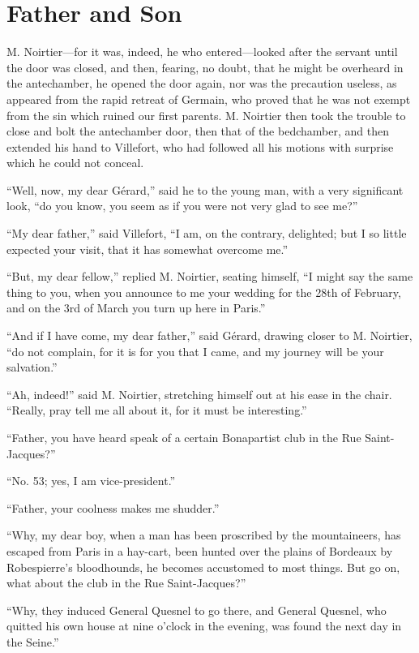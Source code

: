 \chapter{Father and Son}

M. Noirtier—for it was, indeed, he who entered—looked after the servant
until the door was closed, and then, fearing, no doubt, that he might
be overheard in the antechamber, he opened the door again, nor was the
precaution useless, as appeared from the rapid retreat of Germain, who
proved that he was not exempt from the sin which ruined our first
parents. M. Noirtier then took the trouble to close and bolt the
antechamber door, then that of the bedchamber, and then extended his
hand to Villefort, who had followed all his motions with surprise which
he could not conceal.

“Well, now, my dear Gérard,” said he to the young man, with a very
significant look, “do you know, you seem as if you were not very glad
to see me?”

“My dear father,” said Villefort, “I am, on the contrary, delighted;
but I so little expected your visit, that it has somewhat overcome me.”

“But, my dear fellow,” replied M. Noirtier, seating himself, “I might
say the same thing to you, when you announce to me your wedding for the
28th of February, and on the 3rd of March you turn up here in Paris.”

“And if I have come, my dear father,” said Gérard, drawing closer to M.
Noirtier, “do not complain, for it is for you that I came, and my
journey will be your salvation.”

“Ah, indeed!” said M. Noirtier, stretching himself out at his ease in
the chair. “Really, pray tell me all about it, for it must be
interesting.”

“Father, you have heard speak of a certain Bonapartist club in the Rue
Saint-Jacques?”

“No. 53; yes, I am vice-president.”

“Father, your coolness makes me shudder.”

“Why, my dear boy, when a man has been proscribed by the mountaineers,
has escaped from Paris in a hay-cart, been hunted over the plains of
Bordeaux by Robespierre’s bloodhounds, he becomes accustomed to most
things. But go on, what about the club in the Rue Saint-Jacques?”

“Why, they induced General Quesnel to go there, and General Quesnel,
who quitted his own house at nine o’clock in the evening, was found the
next day in the Seine.”


